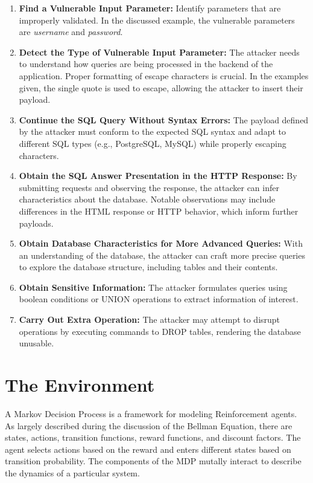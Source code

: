 \documentclass[conference]{IEEEtran}
\begin{document}
\begin{enumerate}
  \item \textbf{Find a Vulnerable Input Parameter:} Identify parameters that are improperly validated. In the discussed example, the vulnerable parameters are \textit{username} and \textit{password}.

  \item \textbf{Detect the Type of Vulnerable Input Parameter:} The attacker needs to understand how queries are being processed in the backend of the application. Proper formatting of escape characters is crucial. In the examples given, the single quote is used to escape, allowing the attacker to insert their payload.

  \item \textbf{Continue the SQL Query Without Syntax Errors:} The payload defined by the attacker must conform to the expected SQL syntax and adapt to different SQL types (e.g., PostgreSQL, MySQL) while properly escaping characters.

  \item \textbf{Obtain the SQL Answer Presentation in the HTTP Response:} By submitting requests and observing the response, the attacker can infer characteristics about the database. Notable observations may include differences in the HTML response or HTTP behavior, which inform further payloads.

  \item \textbf{Obtain Database Characteristics for More Advanced Queries:} With an understanding of the database, the attacker can craft more precise queries to explore the database structure, including tables and their contents.

  \item \textbf{Obtain Sensitive Information:} The attacker formulates queries using boolean conditions or UNION operations to extract information of interest.

  \item \textbf{Carry Out Extra Operation:} The attacker may attempt to disrupt operations by executing commands to DROP tables, rendering the database unusable.
\end{enumerate}

\section{The Environment}
A Markov Decision Process is a framework for modeling Reinforcement agents. As largely described during the discussion of the  Bellman Equation, there are states, actions, transition functions, reward functions, and discount factors. The agent selects actions based on the reward and enters different states based on transition probability. The components of the MDP mutally interact to describe the dynamics of a particular system.
\end{document}
